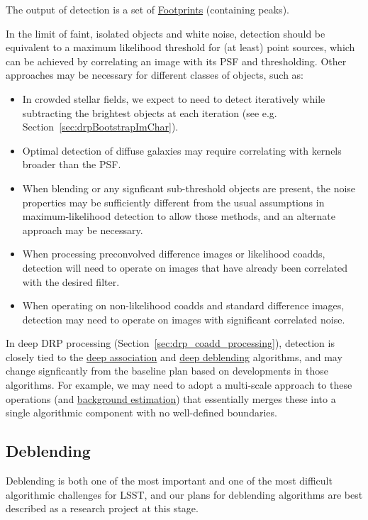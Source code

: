 The output of detection is a set of \hyperref[sec:spFootprints]{Footprints} (containing peaks).

In the limit of faint, isolated objects and white noise, detection should be equivalent to a maximum likelihood threshold for (at least) point sources, which can be achieved by correlating an image with its PSF and thresholding.  Other approaches may be necessary for different classes of objects, such as:
\begin{itemize}
  \item In crowded stellar fields, we expect to need to detect iteratively while subtracting the brightest objects at each iteration (see e.g. Section~\ref{sec:drpBootstrapImChar}).
  \item Optimal detection of diffuse galaxies may require correlating with kernels broader than the PSF.
  \item When blending or any signficant sub-threshold objects are present, the noise properties may be sufficiently different from the usual assumptions in maximum-likelihood detection to allow those methods, and an alternate approach may be necessary.
  \item When processing preconvolved difference images or likelihood coadds, detection will need to operate on images that have already been correlated with the desired filter.
  \item When operating on non-likelihood coadds and standard difference images, detection may need to operate on images with significant correlated noise.
\end{itemize}

In deep DRP processing (Section~\ref{sec:drp_coadd_processing}), detection is closely tied to the \hyperref[drpDeepAssociate]{deep association} and \hyperref[drpDeepDeblend]{deep deblending} algorithms, and may change signficantly from the baseline plan based on developments in those algorithms.  For example, we may need to adopt a multi-scale approach to these operations (and \hyperref[sec:drpCoaddBackgroundEstimation]{background estimation}) that essentially merges these into a single algorithmic component with no well-defined boundaries.


\subsection{Deblending}
\label{sec:acDeblending}

Deblending is both one of the most important and one of the most difficult algorithmic challenges for LSST, and our plans for deblending algorithms are best described as a research project at this stage.

